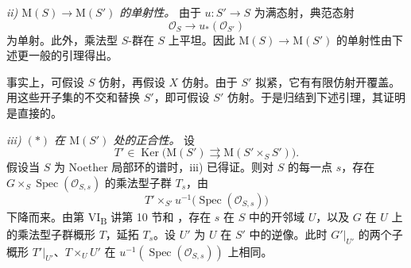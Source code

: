 \smallskip
\noindent\textit{ii) \(\mathrm M(S)\to\mathrm M(S')\) 的单射性。}\quad
由于 \(u:S'\to S\) 为满态射，典范态射
\[
  \mathcal O_S\longrightarrow u_*(\mathcal O_{S'})
\]
为单射。此外，乘法型 \(S\)-群在 \(S\) 上平坦。因此 \(\mathrm M(S)\to\mathrm M(S')\) 的单射性由下述更一般的引理得出。


事实上，可假设 \(S\) 仿射，再假设 \(X\) 仿射。由于 \(S'\) 拟紧，它有有限仿射开覆盖。用这些开子集的不交和替换 \(S'\)，即可假设 \(S'\) 仿射。于是归结到下述引理，其证明是直接的。


\smallskip
\noindent\textit{iii)  \((*)\) 在 \(\mathrm M(S')\) 处的正合性。}\quad
设
\[
  T'\in\operatorname{Ker}\bigl(
    \mathrm M(S')\rightrightarrows
    \mathrm M(S'\times_S S')\bigr).
\]
假设当 \(S\) 为 Noether 局部环的谱时，iii) 已得证。则对 \(S\) 的每一点 \(s\)，存在 \(G\times_S\operatorname{Spec}(\mathcal O_{S,s})\) 的乘法型子群 \(T_s\)，由
\[
  T'\times_{S'}u^{-1}\!\bigl(\operatorname{Spec}(\mathcal O_{S,s})\bigr)
\]
下降而来。由第 VI\textsubscript{B} 讲第 10 节和 ，存在 \(s\) 在 \(S\) 中的开邻域 \(U\)，以及 \(G\) 在 \(U\) 上的乘法型子群概形 \(T\)，延拓 \(T_s\)。设 \(U'\) 为 \(U\) 在 \(S'\) 中的逆像。此时 \(G'|_{U'}\) 的两个子概形 \(T'|_{U'}\)、\(T\times_U U'\) 在 \(u^{-1}(\operatorname{Spec}(\mathcal O_{S,s}))\) 上相同。

